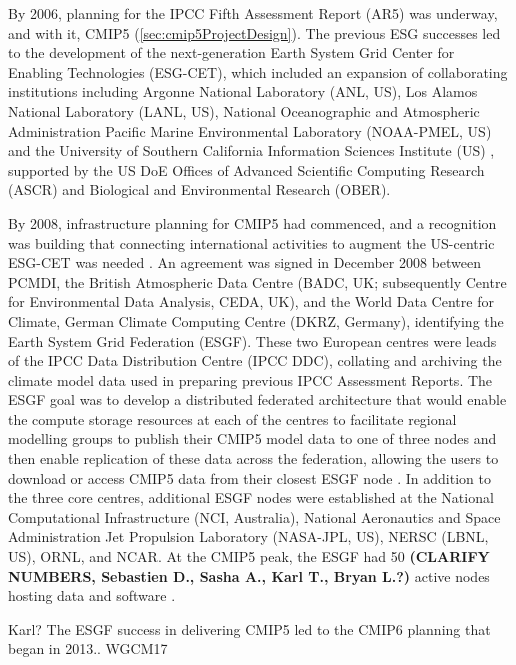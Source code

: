 \documentclass[gmd, preprint]{copernicus}
\newcommand{\mycomment}[1]{}
\def\cred#1{{\color{red}#1}}
\begin{document}
By 2006, planning for the IPCC Fifth Assessment Report (AR5) was underway, and with it, CMIP5 (\autoref{sec:cmip5ProjectDesign}). The previous ESG successes led to the development of the next-generation Earth System Grid Center for Enabling Technologies (ESG-CET), which included an expansion of collaborating institutions including Argonne National Laboratory (ANL, US), Los Alamos National Laboratory (LANL, US), National Oceanographic and Atmospheric Administration Pacific Marine Environmental Laboratory (NOAA-PMEL, US) and the University of Southern California Information Sciences Institute (US) \citep{ananthakrishnan_building_2007}, supported by the US DoE Offices of Advanced Scientific Computing Research (ASCR) and Biological and Environmental Research (OBER).

By 2008, infrastructure planning for CMIP5 had commenced, and a recognition was building that connecting international activities to augment the US-centric ESG-CET was needed \citep{williams_global_2016}. An agreement was signed in December 2008 between PCMDI, the British Atmospheric Data Centre (BADC, UK; subsequently Centre for Environmental Data Analysis, CEDA, UK), and the World Data Centre for Climate, German Climate Computing Centre (DKRZ, Germany), identifying the Earth System Grid Federation (ESGF). These two European centres were leads of the IPCC Data Distribution Centre (IPCC DDC), collating and archiving the climate model data used in preparing previous IPCC Assessment Reports. The ESGF goal was to develop a distributed federated architecture that would enable the compute storage resources at each of the centres to facilitate regional modelling groups to publish their CMIP5 model data to one of three nodes and then enable replication of these data across the federation, allowing the users to download or access CMIP5 data from their closest ESGF node \citep{williams_earth_2011}. In addition to the three core centres, additional ESGF nodes were established at the National Computational Infrastructure (NCI, Australia), National Aeronautics and Space Administration Jet Propulsion Laboratory (NASA-JPL, US), NERSC (LBNL, US), ORNL, and NCAR. At the CMIP5 peak, the ESGF had 50 \cred{\textbf{(CLARIFY NUMBERS, Sebastien D., Sasha A., Karl T., Bryan L.?)}} active nodes hosting data and software \citep{williams_global_2016}.
\mycomment{
CMIP6 current nodes - https://aims2.llnl.gov/nodes
Very early CMIP5 http://web.archive.org/web/20111015000202/http://pcmdi3.llnl.gov/esgcet/home.htm 7 nodes ESG-CET + BADC, WDCC, NCI
ESG-CET NCAR, LLNL, ORNL https://extranet.gfdl.noaa.gov/~vb/curator/AR5-20071017/ESG-CET200710.pdf Oct 2007
2013 Aspen workshop - https://www.wcrp-climate.org/images/modelling/WGCM/WGCM17/WGCM17_report.pdf;
Middleton, Foster and Williams et al., 2006: Earth System Grid II final report 2001-2006 SCIDAC https://www.osti.gov/servlets/purl/1113798 https://doi.org/10.2172/1113798
}
\cred{Karl? The ESGF success in delivering CMIP5 led to the CMIP6 planning that began in 2013.. WGCM17}
\end{document}
